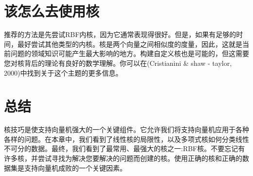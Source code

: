 \section{该怎么去使用核}

推荐的方法是先尝试RBF内核，因为它通常表现得很好。但是，如果有足够的时间，最好尝试其他类型的内核。核是两个向量之间相似度的度量，因此，这就是当前问题的领域知识可能产生最大影响的地方。构建自定义核也是可能的，但这需要您对核背后的理论有良好的数学理解。你可以在(Cristianini \& shaw - taylor, 2000)中找到关于这个主题的更多信息。

\section{总结}

核技巧是使支持向量机强大的一个关键组件。它允许我们将支持向量机应用于各种各样的问题。在本章中，我们看到了线性核的局限性，以及多项式核如何分类线性不可分的数据。最终，我们看到了最常用、最强大的核之一:RBF核。不要忘记有许多核，并尝试寻找为解决您要解决的问题而创建的核。使用正确的核和正确的数据集是支持向量机成败的一个关键因素。
